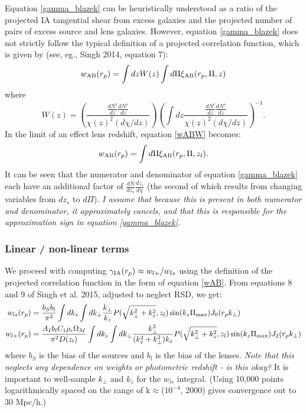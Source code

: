 \documentclass[onecolumn,amsmath,aps,fleqn, superscriptaddress]{revtex4}
\begin{document}
Equation \ref{gamma_blazek} can be heuristically understood as a ratio of the projected IA tangential shear from excess galaxies and the projected number of pairs of excess source and lens galaxies. However, equation \ref{gamma_blazek} does not strictly follow the typical definition of a projected correlation function, which is given by (see, eg., Singh 2014, equation 7):
\begin{equation}
w_{\rm AB}(r_p) = \int dz W(z) \int d\Pi \xi_{\rm AB}(r_p, \Pi, z)
\label{wABW}
\end{equation}
where 
\begin{equation}
W(z) = \left(\frac{\frac{dN^l}{dz}\frac{dN^s}{dz}}{\chi(z)^2 (d\chi/dz)}\right) \left(\int dz \frac{\frac{dN^l}{dz}\frac{dN^s}{dz}}{\chi(z)^2 (d\chi/dz)}\right)^{-1}.
\label{wz}
\end{equation}
In the limit of an effect lens redshift, equation \ref{wABW} becomes:
\begin{equation}
w_{\rm AB}(r_p) = \int d\Pi \xi_{\rm AB}(r_p, \Pi, z_l).
\label{wAB}
\end{equation}
It can be seen that the numerator and denominator of equation \ref{gamma_blazek} each have an additional factor of $\frac{dN}{dz_s}\frac{dz_s}{d\chi}$ (the second of which results from changing variables from $dz_s$ to $d\Pi$). {\it I assume that because this is present in both numerator and denominator, it approximately cancels, and that this is responsible for the approximation sign in equation \ref{gamma_blazek}.} 

\subsubsection*{Linear / non-linear terms}
We proceed with computing $\gamma_{\rm IA}(r_p) \approx w_{l+} / w_{ls}$ using the definition of the projected correlation function in the form of equation \ref{wAB}. From equations 8 and 9 of Singh et al. 2015, adjusted to neglect RSD, we get:
\begin{align}
w_{ls}(r_p) &= \frac{b_S b_l}{\pi^2} \int dk_z  \int dk_\perp  \frac{k_\perp}{k_z} P(\sqrt{k_\perp^2 + k_z^2}, z_l) \sin(k_z \Pi_{\rm max}) J_0(r_p k_\perp) \nonumber \\
w_{l+}(r_p) &= \frac{A_I b_l C_1 \rho_c \Omega_M}{\pi^2 D(z_l)} \int dk_z  \int dk_\perp  \frac{k_\perp^3 }{(k_z^2 + k_\perp^2)k_z} P(\sqrt{k_\perp^2 + k_z^2}, z_l) \sin(k_z \Pi_{\rm max}) J_2(r_p k_\perp)
\label{ws}
\end{align}
where $b_S$ is the bias of the sources and $b_l$ is the bias of the lenses. {\it Note that this neglects any dependence on weights or photometric redshift - is this okay?} It is important to well-sample $k_\perp$ and $k_z$ for the $w_{ls}$ integral. (Using 10,000 points logarithmically spaced on the range of k$\approx$($10^{-4}$, 2000) gives convergence out to $30$ Mpc/h.)
\end{document}
